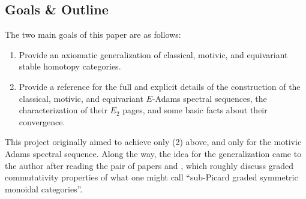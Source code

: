 \documentclass[../main.tex]{subfiles}
\begin{document}
\subsection{Goals \& Outline}

The two main goals of this paper are as follows:
\begin{enumerate}
    \item Provide an axiomatic generalization of classical, motivic, and equivariant stable homotopy categories.
    \item Provide a reference for the full and explicit details of the construction of the classical, motivic, and equivariant $E$-Adams spectral sequences, the characterization of their $E_2$ pages, and some basic facts about their convergence.
\end{enumerate}
This project originally aimed to achieve only (2) above, and only for the motivic Adams spectral sequence. Along the way, the idea for the generalization came to the author after reading the pair of papers \cite{Dugger_2014} and \cite{DDIO}, which roughly discuss graded commutativity properties of what one might call ``sub-Picard graded symmetric monoidal categories''.
\end{document}

